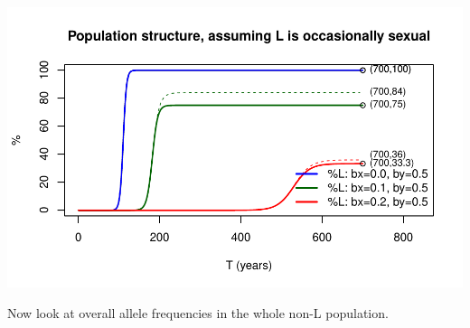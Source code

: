 \documentclass{article}\usepackage[]{graphicx}\usepackage[]{color}
\makeatletter
\def\maxwidth{ %
  \ifdim\Gin@nat@width>\linewidth
    \linewidth
  \else
    \Gin@nat@width
  \fi
}
\newenvironment{knitrout}{}{} %
\makeatother
\begin{document}
\begin{knitrout}
{\centering \includegraphics[width=\maxwidth]{asex-figs-knitr/unnamed-chunk-13-1} 

}



\end{knitrout}

Now look at overall allele frequencies in the whole non-L population.
\end{document}
